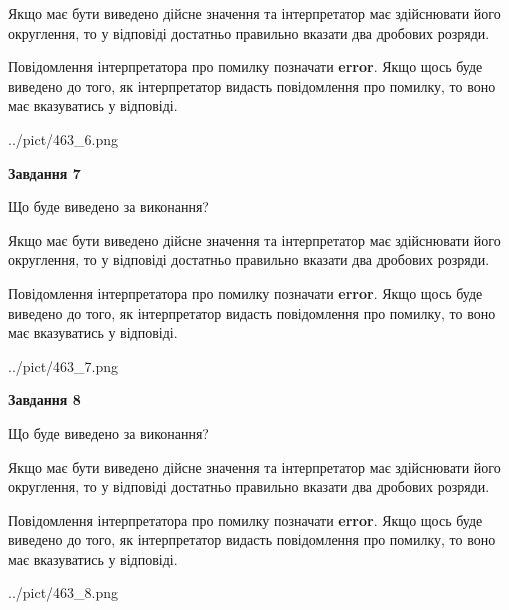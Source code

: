 \documentclass[12pt, ukrainian]{article}
\begin{document}
{\begin {Large}
Якщо має бути виведено дійсне значення та інтерпретатор має здійснювати його округлення, 
то у відповіді достатньо правильно вказати два дробових розряди.

Повідомлення інтерпретатора про помилку позначати \textbf{error}.
Якщо щось буде виведено до того, як інтерпретатор видасть повідомлення про помилку, 
то воно має вказуватись у відповіді. \par

\begin{center}
	{../pict/463_6.png}
\end{center}
\newpage

{\begin {center}\textbf{Завдання 7}\end {center}}\par
Що буде виведено за виконання? \par

Якщо має бути виведено дійсне значення та інтерпретатор має здійснювати його округлення, 
то у відповіді достатньо правильно вказати два дробових розряди.

Повідомлення інтерпретатора про помилку позначати \textbf{error}.
Якщо щось буде виведено до того, як інтерпретатор видасть повідомлення про помилку, 
то воно має вказуватись у відповіді. \par

\begin{center}
	{../pict/463_7.png}
\end{center}
\newpage

{\begin {center}\textbf{Завдання 8}\end {center}}\par
Що буде виведено за виконання? \par

Якщо має бути виведено дійсне значення та інтерпретатор має здійснювати його округлення, 
то у відповіді достатньо правильно вказати два дробових розряди.

Повідомлення інтерпретатора про помилку позначати \textbf{error}.
Якщо щось буде виведено до того, як інтерпретатор видасть повідомлення про помилку, 
то воно має вказуватись у відповіді. \par

\begin{center}
	{../pict/463_8.png}
\end{center}
\newpage


\end{Large}}
\end{document}
